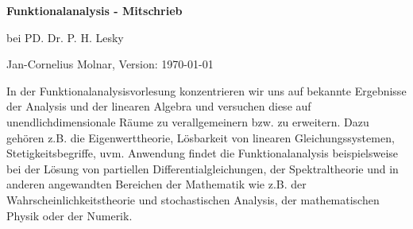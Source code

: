\documentclass[%
	paper=a5,%
	fleqn,%
	DIV=calc,%
	headings=openleft,
	titlepage=false,%
	twoside=true]%
	{scrbook}
\theoremstyle{graymarginwithblueheader}
\theoremstyle{graymarginwithyellowheader}
\theoremstyle{graymarginwithitblackheader}
\theoremstyle{graymarginwithblueheadern}
\theoremstyle{graymarginwithyellowheadern}
\theoremstyle{graymarginwithitblackheadern}
\renewcommand\thesection{\arabic{chapter}-\Alph{section}}
\begin{document}
\begin{titlepage}
\begin{center}
{\huge\bf Funktionalanalysis - Mitschrieb}

bei PD. Dr. P. H. Lesky

Jan-Cornelius Molnar, Version: \today\ \thistime
\end{center}
\end{titlepage}

In der Funktionalanalysisvorlesung konzentrieren wir uns auf bekannte
Ergebnisse der Analysis und der linearen Algebra und versuchen diese auf
unendlichdimensionale Räume zu verallgemeinern bzw. zu erweitern. Dazu gehören
z.B. die Eigenwerttheorie, Lösbarkeit von linearen Gleichungssystemen,
Stetigkeitsbegriffe, uvm.
Anwendung findet die Funktionalanalysis beispielsweise bei der Lösung von
partiellen Differentialgleichungen, der Spektraltheorie und in anderen
angewandten Bereichen der Mathematik wie z.B. der Wahrscheinlichkeitstheorie
und stochastischen Analysis, der mathematischen Physik oder der Numerik.

\tableofcontents

\fancyhead[RO]{\footnotesize\color{gdarkgray}%
	\marginnote{\Big|\;\textbf{\thesection}}\rightmark}
\fancyhead[LE]{\footnotesize\color{gdarkgray}%
	\marginnote{\;\textbf{\thechapter}\Big|}\leftmark}

\fancyfoot[LE]{\footnotesize\color{gdarkgray}%
 	\thepage}%
 \fancyfoot[RO]{\footnotesize\color{gdarkgray}%
 	\thepage}%
 \fancyfoot[RE,LO]{\tiny\color{gdarkgray}\today\; \thistime}



\clearpage


\clearpage


\clearpage


\clearpage


\clearpage


\clearpage


\clearpage



\end{document}
